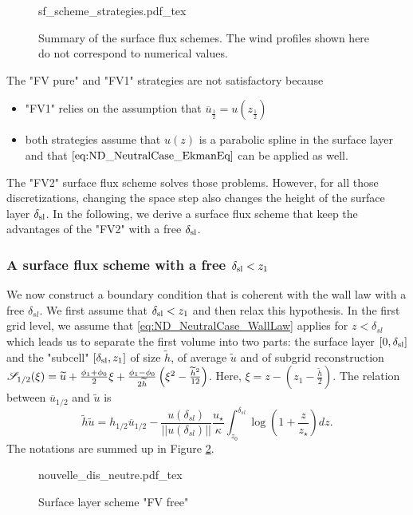 \begin{figure}
	\centering
	{sf_scheme_strategies.pdf_tex}
	\caption{Summary of the surface flux schemes. The
	wind profiles shown here do not correspond to
	numerical values.}
	\label{fig:ND_NeutralCase_summary_sfscheme}
\end{figure}

The "FV pure" and "FV1" strategies are not satisfactory because
\begin{itemize}
	\item "FV1" relies on the assumption that $\overline{u}_{\frac{1}{2}} = u(z_{\frac{1}{2}})$
	\item both strategies assume that $u(z)$ is a parabolic spline in the surface layer and that $\eqref{eq:ND_NeutralCase_EkmanEq}$
		can be applied as well.
\end{itemize}
The "FV2" surface flux scheme solves those problems.
However, for all those discretizations, changing the space step
also changes the height of the surface layer $\delta_{\rm sl}$.
In the following, we derive a surface flux scheme that keep
the advantages of the "FV2" with a free $\delta_{\rm sl}$.

\subsubsection{A surface flux scheme with a free $\delta_{\rm sl}<z_1$}
We now construct a boundary condition that is coherent
with the wall law with a free $\delta_{sl}$. We first assume
that $\delta_{\rm sl} < z_1$ and then relax this hypothesis.
In the first grid level, we assume that
\eqref{eq:ND_NeutralCase_WallLaw} applies for $z<\delta_{sl}$
which leads us to separate the 
first volume into two parts: the surface layer $[0,\delta_{\rm sl}]$ and the "subcell" $[\delta_{\rm sl}, z_1]$ of size $\widetilde{h}$, of average $\widetilde{u}$
and of subgrid reconstruction
${\cal S}_{1/2}(\xi) = \widetilde{u} + \frac{\phi_{1} + \phi_{0}}{2} \xi
+ \frac{\phi_{1} - \phi_{0}}{2\widetilde{h}}\left(\xi^2 - \frac{\widetilde{h}^2}{12}\right)
$.
Here, $\xi = z - (z_1 - \frac{\widetilde{h}}{2})$.
The relation between $\overline{u}_{1/2}$ and $\widetilde{u}$ is 
\begin{equation}
\widetilde{h}\widetilde{u} = h_{1/2}\overline{u}_{1/2} - \frac{u(\delta_{sl})}{||u(\delta_{sl})||}\frac{{u_\star}}{\kappa}\int_{z_0}^{\delta_{sl}} \log(1+\frac{z}{z_{\star}}) dz.
\end{equation}
The notations are summed up in Figure
\ref{fig:ND_NeutralCase_nouvelle_dis_neutre}.
\begin{figure}
	{nouvelle_dis_neutre.pdf_tex}
	\caption{Surface layer scheme "FV free"}
	\label{fig:ND_NeutralCase_nouvelle_dis_neutre}
\end{figure}


